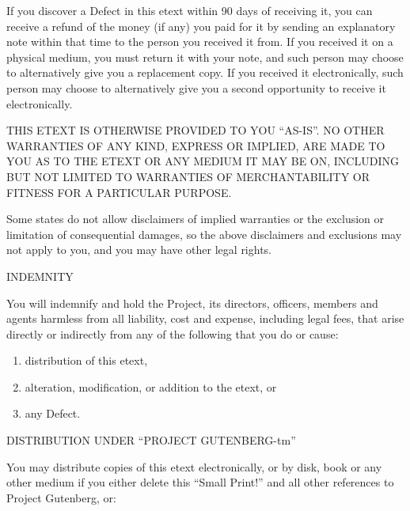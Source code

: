 \documentclass[12pt]{book}
\begin{document}
If you discover a Defect in this etext within 90 days of
receiving it, you can receive a refund of the money (if any)
you paid for it by sending an explanatory note within that
time to the person you received it from.  If you received it
on a physical medium, you must return it with your note, and
such person may choose to alternatively give you a replacement
copy.  If you received it electronically, such person may
choose to alternatively give you a second opportunity to
receive it electronically.

THIS ETEXT IS OTHERWISE PROVIDED TO YOU ``AS-IS''.  NO OTHER
WARRANTIES OF ANY KIND, EXPRESS OR IMPLIED, ARE MADE TO YOU AS
TO THE ETEXT OR ANY MEDIUM IT MAY BE ON, INCLUDING BUT NOT
LIMITED TO WARRANTIES OF MERCHANTABILITY OR FITNESS FOR A
PARTICULAR PURPOSE.

Some states do not allow disclaimers of implied warranties or
the exclusion or limitation of consequential damages, so the
above disclaimers and exclusions may not apply to you, and you
may have other legal rights.

\begin{center}
INDEMNITY
\end{center}

You will indemnify and hold the Project, its directors,
officers, members and agents harmless from all liability, cost
and expense, including legal fees, that arise directly or
indirectly from any of the following that you do or cause:

\begin{enumerate}
\item distribution of this etext,
\item  alteration, modification,
or addition to the etext, or
\item  any Defect.
\end{enumerate}

\begin{center}
DISTRIBUTION UNDER ``PROJECT GUTENBERG-tm''
\end{center}

You may distribute copies of this etext electronically, or by
disk, book or any other medium if you either delete this
``Small Print!'' and all other references to Project Gutenberg,
or:
\end{document}
